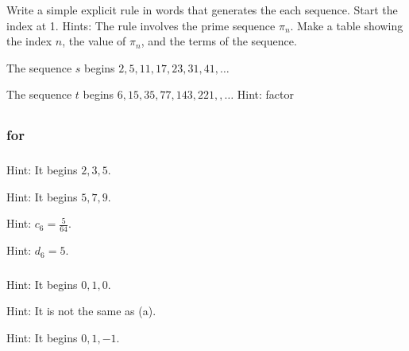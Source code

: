 \begin{exer}[\exerE] %
\label{exer_NTE_pisubn_continued}  
    Write a simple explicit rule in words that generates the each sequence. Start the index at 1. Hints: The rule involves the prime sequence $\pi_n$.  Make a table showing the index $n$, the value of $\pi_n$, and the terms of the sequence. 
        \begin{exerpart}
            \item The sequence $s$ begins $2, 5, 11, 17, 23, 31, 41,\ldots$ %
            \item The sequence $t$ begins $6, 15, 35, 77, 143, 221, ,\ldots$ Hint: factor %
        \end{exerpart}
\end{exer}

\subsection{\answers}

\subsubsection{\answers for  \subdefnseq}

\subsubsection*{ \answers}
\begin{apart}
    \item Hint: It begins $2, 3, 5$.
    \item Hint: It begins $5, 7, 9$.
    \item Hint: $c_6=\frac{5}{64}$.
    \item Hint: $d_6=5$.
\end{apart}

\subsubsection*{ \answers}
\begin{apart}
    \item Hint: It begins $0,1,0$.
    \item Hint: It is not the same as (a).
    \item Hint: It begins $0,1,-1$.
\end{apart}

